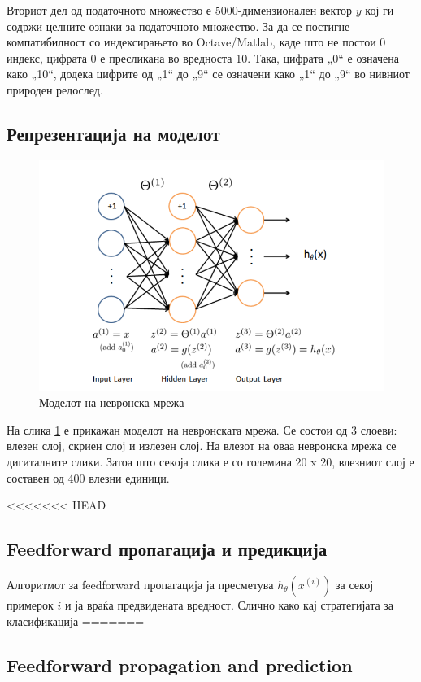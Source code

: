 Вториот дел од податочното множество е 5000-димензионален вектор $y$ кој 
ги содржи целните ознаки за податочното множество. За да се постигне
компатибилност со индексирањето во Octave/Matlab, каде што не постои 0 индекс,
цифрата 0 е пресликана во вредноста 10. Така, цифрата „0“ е означена како „10“,
додека цифрите од „1“ до „9“ се означени како „1“ до „9“ во нивниот природен
редослед.

\subsection{Репрезентација на моделот}

\begin{figure}[htb]
\centering
\includegraphics[width=.9\textwidth]{src/neuralNetwork2/neuralNetwork}
\caption{Моделот на невронска мрежа}
\label{fig:neuralNetwork}
\end{figure}

На слика \ref{fig:neuralNetwork} е прикажан моделот на невронската мрежа. Се
состои од 3 слоеви: влезен слој, скриен слој и излезен слој. На влезот на оваа
невронска мрежа се дигиталните слики. Затоа што секоја слика е со големина 20 x
20, влезниот слој е составен од 400 влезни единици.

<<<<<<< HEAD
\subsection{Feedforward пропагација и предикција}

Алгоритмот за feedforward пропагација ја пресметува $h_\theta(x^{(i)})$ за секој
примерок $i$ и ја враќа предвидената вредност. Слично како кај стратегијата за класификација
=======
\subsection{Feedforward propagation and prediction}

